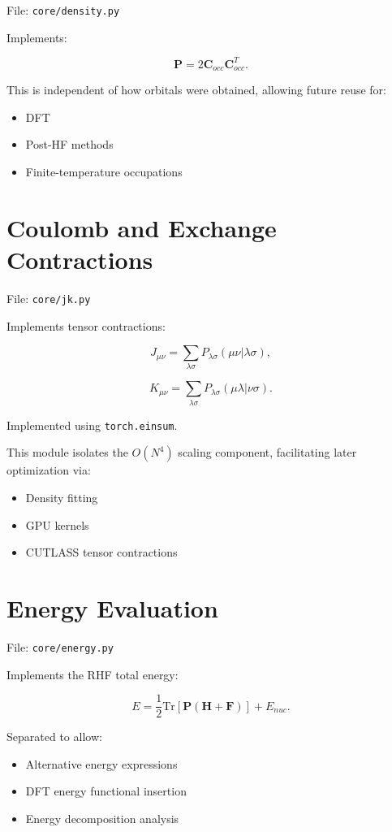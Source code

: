 \documentclass[11pt]{article}
\begin{document}
File: \texttt{core/density.py}

Implements:

\[
\mathbf{P} = 2 \mathbf{C}_{occ} \mathbf{C}_{occ}^T.
\]

This is independent of how orbitals were obtained,
allowing future reuse for:

\begin{itemize}
\item DFT
\item Post-HF methods
\item Finite-temperature occupations
\end{itemize}

\section{Coulomb and Exchange Contractions}

File: \texttt{core/jk.py}

Implements tensor contractions:

\[
J_{\mu\nu} =
\sum_{\lambda\sigma}
P_{\lambda\sigma}
(\mu\nu|\lambda\sigma),
\]

\[
K_{\mu\nu} =
\sum_{\lambda\sigma}
P_{\lambda\sigma}
(\mu\lambda|\nu\sigma).
\]

Implemented using \texttt{torch.einsum}.

This module isolates the $O(N^4)$ scaling component,
facilitating later optimization via:

\begin{itemize}
\item Density fitting
\item GPU kernels
\item CUTLASS tensor contractions
\end{itemize}

\section{Energy Evaluation}

File: \texttt{core/energy.py}

Implements the RHF total energy:

\[
E =
\frac{1}{2}
\mathrm{Tr}
\left[
\mathbf{P}
(\mathbf{H} + \mathbf{F})
\right]
+ E_{nuc}.
\]

Separated to allow:

\begin{itemize}
\item Alternative energy expressions
\item DFT energy functional insertion
\item Energy decomposition analysis
\end{itemize}
\end{document}
